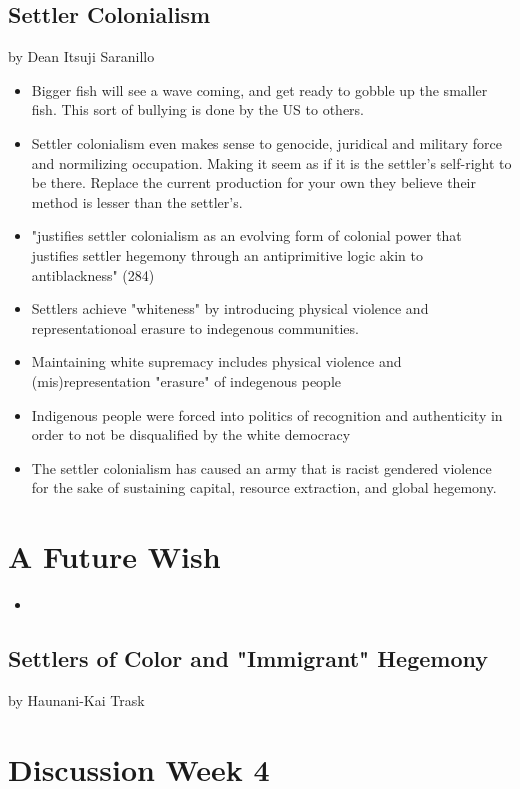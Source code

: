 \documentclass{article}
\begin{document}
\subsection{Settler Colonialism}
by Dean Itsuji Saranillo

\begin{itemize}
  \item Bigger fish will see a wave coming, and get ready to gobble up the
    smaller fish. This sort of bullying is done by the US to others.
  \item Settler colonialism even makes sense to genocide,
    juridical and military force and normilizing occupation. Making it seem
    as if it is the settler's self-right to be there.
    Replace the current production for your own they believe
    their method is lesser than the settler's.
  \item "justifies settler colonialism as an evolving form
    of colonial power that justifies settler hegemony through an
    antiprimitive logic akin to antiblackness" (284)
  \item Settlers achieve "whiteness" by introducing physical violence
    and representationoal erasure to indegenous communities.
  \item Maintaining white supremacy includes
    physical violence and (mis)representation "erasure" of indegenous people
    \item Indigenous people were forced into politics of recognition and authenticity
      in order to not be disqualified by the white democracy
    \item The settler colonialism has caused an army that is racist gendered violence
      for the sake of sustaining capital, resource extraction, and global hegemony.

\end{itemize}

\section*{A Future Wish}
\begin{itemize}
  \item
\end{itemize}

\subsection{Settlers of Color and "Immigrant" Hegemony}
by Haunani-Kai Trask

\section{Discussion Week 4}
\end{document}
